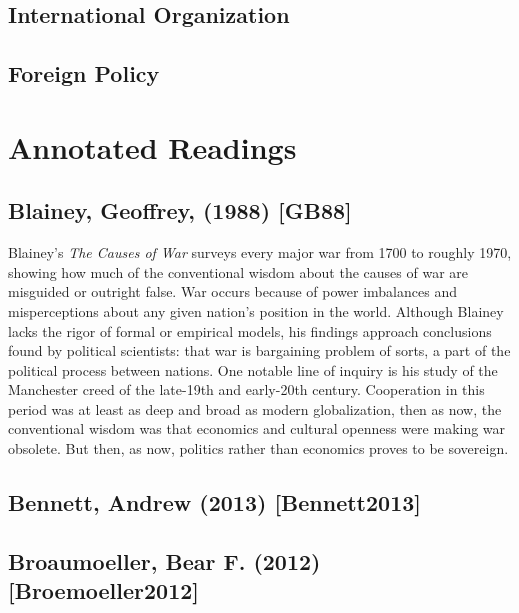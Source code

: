\documentclass[11pt]{article}
\begin{document}
\subsection{International Organization}
\label{sec-1-4}

\subsection{Foreign Policy}
\label{sec-1-5}

\section{Annotated Readings}
\label{sec-2}
\subsection{Blainey, Geoffrey, (1988) [GB88]}
\label{sec-2-1}
Blainey's \emph{The Causes of War} surveys every major war from 1700 to
roughly 1970, showing how much of the conventional wisdom about the
causes of war are misguided or outright false. War occurs because of
power imbalances and misperceptions about any given nation's position
in the world. Although Blainey lacks the rigor of formal or empirical
models, his findings approach conclusions found by political
scientists: that war is bargaining problem of sorts, a part of the
political process between nations. One notable line of inquiry is his
study of the Manchester creed of the late-19th and early-20th
century. Cooperation in this period was at least as deep and broad as
modern globalization, then as now, the conventional wisdom was that
economics and cultural openness were making war obsolete. But then, as
now, politics rather than economics proves to be sovereign.  
\subsection{Bennett, Andrew (2013) [Bennett2013]}
\label{sec-2-2}
\subsection{Broaumoeller, Bear F. (2012) [Broemoeller2012]}
\label{sec-2-3}
\end{document}
